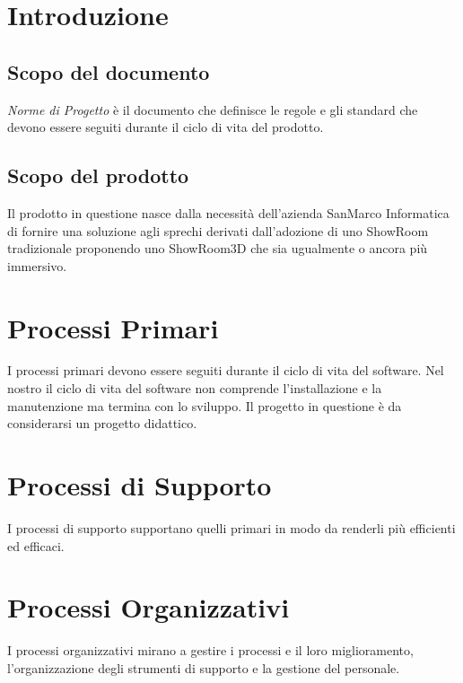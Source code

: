 \documentclass[a4paper]{article}
\begin{document}




\pagebreak

{
    \hypersetup{linkcolor=black}
    \tableofcontents
    \listoffigures %
}
\pagebreak

\section{Introduzione}
\subsection{Scopo del documento}
\textit{Norme di Progetto} è il documento che definisce le regole e gli standard che devono essere seguiti durante il ciclo di vita del prodotto.
\subsection{Scopo del prodotto}
Il prodotto in questione nasce dalla necessità dell'azienda SanMarco Informatica di fornire una soluzione agli sprechi
derivati dall'adozione di uno ShowRoom tradizionale proponendo uno ShowRoom3D che sia ugualmente o ancora più immersivo.
\section{Processi Primari}
I processi primari devono essere seguiti durante il ciclo di vita del software.
Nel nostro il ciclo di vita del software non comprende l'installazione e la manutenzione ma termina con lo sviluppo.
Il progetto in questione è da considerarsi un progetto didattico.

\pagebreak
\section{Processi di Supporto}
I processi di supporto supportano quelli primari in modo da renderli più efficienti ed efficaci.

\pagebreak
\section{Processi Organizzativi}
I processi organizzativi mirano a gestire i processi e il loro miglioramento, l'organizzazione degli strumenti 
di supporto e la gestione del personale.

\pagebreak

\pagebreak

\pagebreak

\pagebreak
\end{document}
